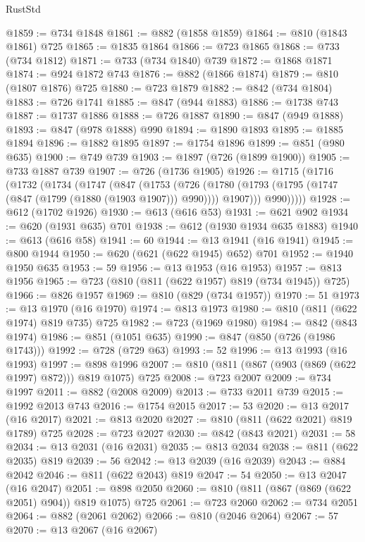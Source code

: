 \begin{lexlean}{RustStd}
\begin{coremodule}
@1859 := @734 @1848
@1861 := @882 (@1858 @1859)
@1864 := @810 (@1843 @1861) @725
@1865 := @1835 @1864
@1866 := @723 @1865
@1868 := @733 (@734 @1812)
@1871 := @733 (@734 @1840) @739
@1872 := @1868 @1871
@1874 := @924 @1872 @743
@1876 := @882 (@1866 @1874)
@1879 := @810 (@1807 @1876) @725
@1880 := @723 @1879
@1882 := @842 (@734 @1804)
@1883 := @726 @1741
@1885 := @847 (@944 @1883)
@1886 := @1738 @743
@1887 := @1737 @1886
@1888 := @726 @1887
@1890 := @847 (@949 @1888)
@1893 := @847 (@978 @1888) @990
@1894 := @1890 @1893
@1895 := @1885 @1894
@1896 := @1882 @1895
@1897 := @1754 @1896
@1899 := @851 (@980 @635)
@1900 := @749 @739
@1903 := @1897 (@726 (@1899 @1900))
@1905 := @733 @1887 @739
@1907 := @726 (@1736 @1905)
@1926 := @1715
    (@1716
      (@1732
        (@1734
          (@1747
            (@847
              (@1753
                (@726
                  (@1780 (@1793 (@1795 (@1747 (@847 (@1799 (@1880 (@1903 @1907))) @990)))) @1907)))
              @990)))))
@1928 := @612 (@1702 @1926)
@1930 := @613 (@616 @53)
@1931 := @621 @902
@1934 := @620 (@1931 @635) @701
@1938 := @612 (@1930 @1934 @635 @1883)
@1940 := @613 (@616 @58)
@1941 := 60
@1944 := @13 @1941 (@16 @1941)
@1945 := @800 @1944
@1950 := @620 (@621 (@622 @1945) @652) @701
@1952 := @1940 @1950 @635
@1953 := 59
@1956 := @13 @1953 (@16 @1953)
@1957 := @813 @1956
@1965 := @723 (@810 (@811 (@622 @1957) @819 (@734 @1945)) @725)
@1966 := @826 @1957
@1969 := @810 (@829 (@734 @1957))
@1970 := 51
@1973 := @13 @1970 (@16 @1970)
@1974 := @813 @1973
@1980 := @810 (@811 (@622 @1974) @819 @735) @725
@1982 := @723 (@1969 @1980)
@1984 := @842 (@843 @1974)
@1986 := @851 (@1051 @635)
@1990 := @847 (@850 (@726 (@1986 @1743)))
@1992 := @728 (@729 @63)
@1993 := 52
@1996 := @13 @1993 (@16 @1993)
@1997 := @898 @1996
@2007 := @810 (@811 (@867 (@903 (@869 (@622 @1997) @872))) @819 @1075) @725
@2008 := @723 @2007
@2009 := @734 @1997
@2011 := @882 (@2008 @2009)
@2013 := @733 @2011 @739
@2015 := @1992 @2013 @743
@2016 := @1754 @2015
@2017 := 53
@2020 := @13 @2017 (@16 @2017)
@2021 := @813 @2020
@2027 := @810 (@811 (@622 @2021) @819 @1789) @725
@2028 := @723 @2027
@2030 := @842 (@843 @2021)
@2031 := 58
@2034 := @13 @2031 (@16 @2031)
@2035 := @813 @2034
@2038 := @811 (@622 @2035) @819
@2039 := 56
@2042 := @13 @2039 (@16 @2039)
@2043 := @884 @2042
@2046 := @811 (@622 @2043) @819
@2047 := 54
@2050 := @13 @2047 (@16 @2047)
@2051 := @898 @2050
@2060 := @810 (@811 (@867 (@869 (@622 @2051) @904)) @819 @1075) @725
@2061 := @723 @2060
@2062 := @734 @2051
@2064 := @882 (@2061 @2062)
@2066 := @810 (@2046 @2064)
@2067 := 57
@2070 := @13 @2067 (@16 @2067)

\end{coremodule}
\end{lexlean}
